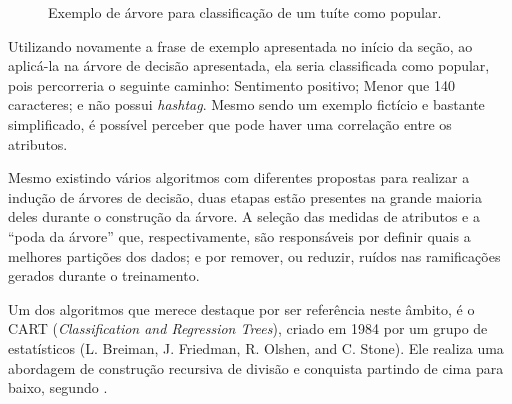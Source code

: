 \documentclass[oneside,openright,12pt]{ufsm_2015} %
\begin{document}
    \begin{figure}[ht]
    \caption{Exemplo de árvore para classificação de um tuíte como popular.}
    \centering
    \label{fig:exemplo_arvore}
    \end{figure}
    
    \par Utilizando novamente a frase de exemplo apresentada no início da seção, ao aplicá-la na árvore de decisão apresentada, ela seria classificada como popular, pois percorreria o seguinte caminho: Sentimento positivo; Menor que 140 caracteres; e não possui \textit{hashtag}. Mesmo sendo um exemplo fictício e bastante simplificado, é possível perceber que pode haver uma correlação entre os atributos.
    
    \par Mesmo existindo vários algoritmos com diferentes propostas para realizar a indução de árvores de decisão, duas etapas estão presentes na grande maioria deles durante o construção da árvore. A seleção das medidas de atributos e a ``poda da árvore'' que, respectivamente, são responsáveis por definir quais a melhores partições dos dados; e por remover, ou reduzir, ruídos nas ramificações gerados durante o treinamento.
    
    \par Um dos algoritmos que merece destaque por ser referência neste âmbito, é o CART (\textit{Classification and Regression Trees}), criado em 1984 por um grupo de estatísticos (L. Breiman, J. Friedman, R. Olshen, and C. Stone). Ele realiza uma abordagem de construção recursiva de divisão e conquista partindo de cima para baixo, segundo \cite{book:han:11}.
    
\end{document}
